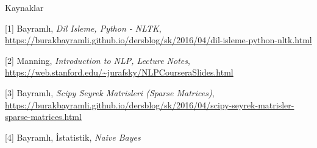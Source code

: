 \documentclass[12pt,fleqn]{article}\usepackage{../../common}
\begin{document}
Kaynaklar

[1] Bayramlı, 
    {\em Dil Isleme, Python - NLTK}, 
    \url{https://burakbayramli.github.io/dersblog/sk/2016/04/dil-isleme-python-nltk.html}

[2] Manning, {\em Introduction to NLP, Lecture Notes}, \url{https://web.stanford.edu/~jurafsky/NLPCourseraSlides.html}

[3] Bayramlı, 
    {\em Scipy Seyrek Matrisleri (Sparse Matrices)}, 
    \url{https://burakbayramli.github.io/dersblog/sk/2016/04/scipy-seyrek-matrisler-sparse-matrices.html}

[4] Bayramlı, İstatistik, {\em Naive  Bayes}
\end{document}
